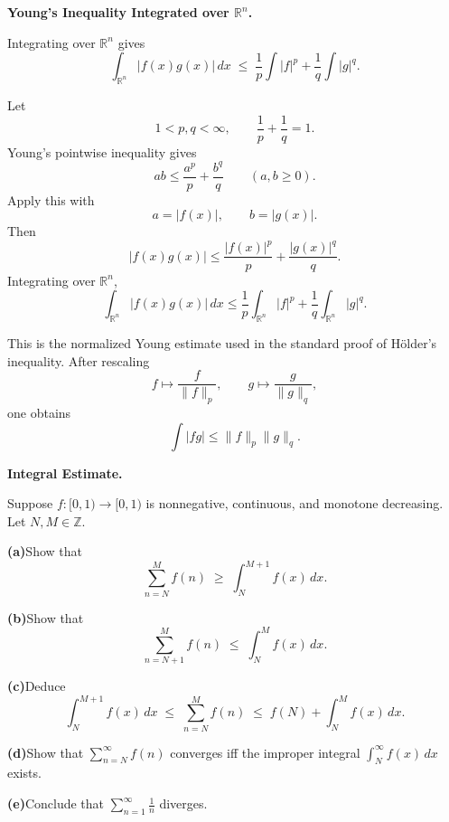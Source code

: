 \begin{problem}[CP-II-0186]
\label{prob:cp-ii-0186}
\textbf{Young's Inequality Integrated over \(\mathbb R^n\).}

\hspace*{1.5em}Integrating over $\mathbb{R}^n$ gives
	\[
	\int_{\mathbb{R}^n} |f(x)g(x)|\,dx
	\;\le\;
	\frac{1}{p}\int |f|^p + \frac{1}{q}\int |g|^q.
	\]
\end{problem}

\begin{solution}
Let
\[
1<p,q<\infty,
\qquad
\frac1p+\frac1q=1.
\]
Young's pointwise inequality gives
\[
ab
\le
\frac{a^p}{p}
+
\frac{b^q}{q}
\qquad(a,b\ge0).
\]
Apply this with
\[
a=|f(x)|,
\qquad
b=|g(x)|.
\]
Then
\[
|f(x)g(x)|
\le
\frac{|f(x)|^p}{p}
+
\frac{|g(x)|^q}{q}.
\]
Integrating over \(\mathbb R^n\),
\[
\boxed{
\int_{\mathbb R^n}|f(x)g(x)|\,dx
\le
\frac1p\int_{\mathbb R^n}|f|^p
+
\frac1q\int_{\mathbb R^n}|g|^q.
}
\]

This is the normalized Young estimate used in the standard proof of Hölder's inequality.
After rescaling
\[
f\mapsto\frac{f}{\|f\|_p},
\qquad
g\mapsto\frac{g}{\|g\|_q},
\]
one obtains
\[
\int|fg|
\le
\|f\|_p\|g\|_q.
\]
\end{solution}


\begin{problem}[CP-II-0187]
\label{prob:cp-ii-0187}
\textbf{Integral Estimate.}

\hspace*{1.5em}Suppose $f:[0,1)\to[0,1)$ is nonnegative, continuous, and monotone decreasing.
Let $N,M\in\mathbb{Z}$.

	\par\smallskip\noindent\textbf{(a)}\quad Show that
	\[
	\sum_{n=N}^M f(n)\;\geq\;\int_N^{M+1} f(x)\,dx.
	\]

	\par\smallskip\noindent\textbf{(b)}\quad Show that
	\[
	\sum_{n=N+1}^M f(n)\;\leq\;\int_N^M f(x)\,dx.
	\]

	\par\smallskip\noindent\textbf{(c)}\quad Deduce
	\[
	\int_N^{M+1} f(x)\,dx \;\leq\; \sum_{n=N}^M f(n)\;\leq\; f(N)+\int_N^M f(x)\,dx.
	\]

	\par\smallskip\noindent\textbf{(d)}\quad Show that $\sum_{n=N}^\infty f(n)$ converges iff the improper integral
	$\int_N^\infty f(x)\,dx$ exists.

	\par\smallskip\noindent\textbf{(e)}\quad Conclude that $\sum_{n=1}^\infty \tfrac{1}{n}$ diverges.
\end{problem}

